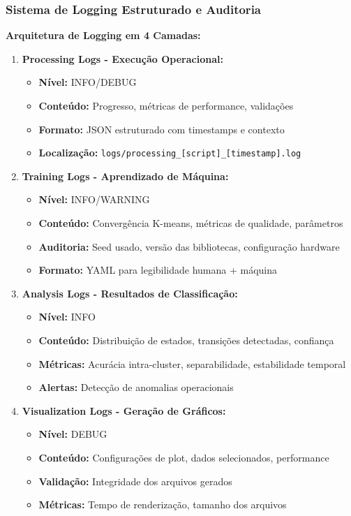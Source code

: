 \subsubsection{Sistema de Logging Estruturado e Auditoria}

\textbf{Arquitetura de Logging em 4 Camadas:}

\begin{enumerate}
    \item \textbf{Processing Logs - Execução Operacional:}
    \begin{itemize}
        \item \textbf{Nível:} INFO/DEBUG
        \item \textbf{Conteúdo:} Progresso, métricas de performance, validações
        \item \textbf{Formato:} JSON estruturado com timestamps e contexto
        \item \textbf{Localização:} \texttt{logs/processing\_[script]\_[timestamp].log}
    \end{itemize}

    \item \textbf{Training Logs - Aprendizado de Máquina:}
    \begin{itemize}
        \item \textbf{Nível:} INFO/WARNING
        \item \textbf{Conteúdo:} Convergência K-means, métricas de qualidade, parâmetros
        \item \textbf{Auditoria:} Seed usado, versão das bibliotecas, configuração hardware
        \item \textbf{Formato:} YAML para legibilidade humana + máquina
    \end{itemize}

    \item \textbf{Analysis Logs - Resultados de Classificação:}
    \begin{itemize}
        \item \textbf{Nível:} INFO
        \item \textbf{Conteúdo:} Distribuição de estados, transições detectadas, confiança
        \item \textbf{Métricas:} Acurácia intra-cluster, separabilidade, estabilidade temporal
        \item \textbf{Alertas:} Detecção de anomalias operacionais
    \end{itemize}

    \item \textbf{Visualization Logs - Geração de Gráficos:}
    \begin{itemize}
        \item \textbf{Nível:} DEBUG
        \item \textbf{Conteúdo:} Configurações de plot, dados selecionados, performance
        \item \textbf{Validação:} Integridade dos arquivos gerados
        \item \textbf{Métricas:} Tempo de renderização, tamanho dos arquivos
    \end{itemize}
\end{enumerate}

